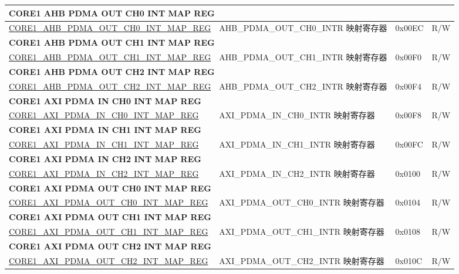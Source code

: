 \begin{longtable}{ | p{7.5cm} | p{7.2cm} | p{1.3cm} | p{1cm} | }
\multicolumn{4}{|l|}{\textbf{CORE1 AHB PDMA OUT CH0 INT MAP REG}} \\ \hline
\hyperref[regdesc:CORE1AHBPDMAOUTCH0INTMAPREG]{CORE1\_AHB\_PDMA\_OUT\_CH0\_INT\_MAP\_REG} & AHB\_PDMA\_OUT\_CH0\_INTR 映射寄存器 & 0x00EC & R/W \\ \hline
\multicolumn{4}{|l|}{\textbf{CORE1 AHB PDMA OUT CH1 INT MAP REG}} \\ \hline
\hyperref[regdesc:CORE1AHBPDMAOUTCH1INTMAPREG]{CORE1\_AHB\_PDMA\_OUT\_CH1\_INT\_MAP\_REG} & AHB\_PDMA\_OUT\_CH1\_INTR 映射寄存器 & 0x00F0 & R/W \\ \hline
\multicolumn{4}{|l|}{\textbf{CORE1 AHB PDMA OUT CH2 INT MAP REG}} \\ \hline
\hyperref[regdesc:CORE1AHBPDMAOUTCH2INTMAPREG]{CORE1\_AHB\_PDMA\_OUT\_CH2\_INT\_MAP\_REG} & AHB\_PDMA\_OUT\_CH2\_INTR 映射寄存器 & 0x00F4 & R/W \\ \hline
\multicolumn{4}{|l|}{\textbf{CORE1 AXI PDMA IN CH0 INT MAP REG}} \\ \hline
\hyperref[regdesc:CORE1AXIPDMAINCH0INTMAPREG]{CORE1\_AXI\_PDMA\_IN\_CH0\_INT\_MAP\_REG} & AXI\_PDMA\_IN\_CH0\_INTR 映射寄存器 & 0x00F8 & R/W \\ \hline
\multicolumn{4}{|l|}{\textbf{CORE1 AXI PDMA IN CH1 INT MAP REG}} \\ \hline
\hyperref[regdesc:CORE1AXIPDMAINCH1INTMAPREG]{CORE1\_AXI\_PDMA\_IN\_CH1\_INT\_MAP\_REG} & AXI\_PDMA\_IN\_CH1\_INTR 映射寄存器 & 0x00FC & R/W \\ \hline
\multicolumn{4}{|l|}{\textbf{CORE1 AXI PDMA IN CH2 INT MAP REG}} \\ \hline
\hyperref[regdesc:CORE1AXIPDMAINCH2INTMAPREG]{CORE1\_AXI\_PDMA\_IN\_CH2\_INT\_MAP\_REG} & AXI\_PDMA\_IN\_CH2\_INTR 映射寄存器 & 0x0100 & R/W \\ \hline
\multicolumn{4}{|l|}{\textbf{CORE1 AXI PDMA OUT CH0 INT MAP REG}} \\ \hline
\hyperref[regdesc:CORE1AXIPDMAOUTCH0INTMAPREG]{CORE1\_AXI\_PDMA\_OUT\_CH0\_INT\_MAP\_REG} & AXI\_PDMA\_OUT\_CH0\_INTR 映射寄存器 & 0x0104 & R/W \\ \hline
\multicolumn{4}{|l|}{\textbf{CORE1 AXI PDMA OUT CH1 INT MAP REG}} \\ \hline
\hyperref[regdesc:CORE1AXIPDMAOUTCH1INTMAPREG]{CORE1\_AXI\_PDMA\_OUT\_CH1\_INT\_MAP\_REG} & AXI\_PDMA\_OUT\_CH1\_INTR 映射寄存器 & 0x0108 & R/W \\ \hline
\multicolumn{4}{|l|}{\textbf{CORE1 AXI PDMA OUT CH2 INT MAP REG}} \\ \hline
\hyperref[regdesc:CORE1AXIPDMAOUTCH2INTMAPREG]{CORE1\_AXI\_PDMA\_OUT\_CH2\_INT\_MAP\_REG} & AXI\_PDMA\_OUT\_CH2\_INTR 映射寄存器 & 0x010C & R/W \\ \hline

\end{longtable}
